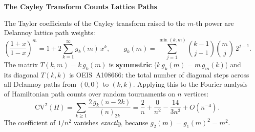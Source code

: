 \documentclass[12pt]{article}
\begin{document}
\begin{center}
{\Large\bfseries The Cayley Transform Counts Lattice Paths}
\end{center}

\medskip

The Taylor coefficients of the Cayley transform raised to the $m$-th power are Delannoy lattice path weights:
\[
\left(\frac{1+x}{1-x}\right)^{\!m} = 1 + 2\sum_{k=1}^{\infty} g_k(m)\, x^k, \qquad g_k(m) = \sum_{j=1}^{\min(k,m)} \binom{k{-}1}{j{-}1}\binom{m}{j}\, 2^{j-1}.
\]
The matrix $T(k,m) = k\,g_k(m)$ is \textbf{symmetric} ($k\,g_k(m) = m\,g_m(k)$) and its diagonal $T(k,k)$ is OEIS~A108666: the total number of diagonal steps across all Delannoy paths from $(0,0)$ to $(k,k)$. Applying this to the Fourier analysis of Hamiltonian path counts over random tournaments on $n$ vertices:
\[
\mathrm{CV}^2(H) = \sum_{k \geq 1} \frac{2\,g_k(n{-}2k)}{(n)_{2k}} = \frac{2}{n} + \frac{0}{n^2} - \frac{14}{3n^3} + O(n^{-4}).
\]
The coefficient of $1/n^2$ vanishes \emph{exactly}, because $g_2(m) = g_1(m)^2 = m^2$.
\end{document}
